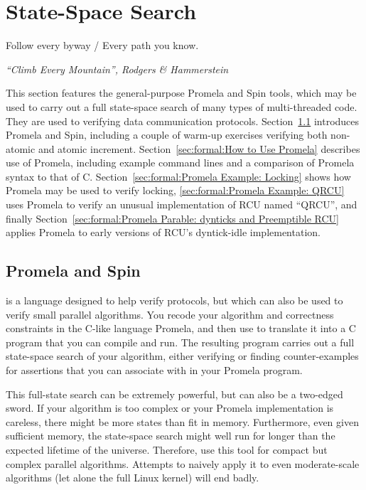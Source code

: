 
\section{State-Space Search}
\label{sec:formal:State-Space Search}
%
\epigraph{Follow every byway / Every path you know.}
	 {\emph{``Climb Every Mountain'', Rodgers \& Hammerstein}}

This section features the general-purpose Promela and Spin tools,
which may be used to carry out a full
state-space search of many types of multi-threaded code.
They are used to verifying data communication protocols.
Section~\ref{sec:formal:Promela and Spin}
introduces Promela and Spin, including a couple of warm-up exercises
verifying both non-atomic and atomic increment.
Section~\ref{sec:formal:How to Use Promela}
describes use of Promela, including example command lines and a
comparison of Promela syntax to that of C\@.
Section~\ref{sec:formal:Promela Example: Locking}
shows how Promela may be used to verify locking,
\ref{sec:formal:Promela Example: QRCU}
uses Promela to verify an unusual implementation of RCU named ``QRCU'',
and finally
Section~\ref{sec:formal:Promela Parable: dynticks and Preemptible RCU}
applies Promela to early versions of RCU's dyntick-idle implementation.

\subsection{Promela and Spin}
\label{sec:formal:Promela and Spin}

 is a language designed to help verify protocols, but which
can also be used to verify small parallel algorithms.
You recode your algorithm and correctness constraints in the C-like
language Promela, and then use  to translate it into a C program
that you can compile and run.
The resulting program carries out a full state-space search of your
algorithm, either verifying or finding counter-examples for
assertions that you can associate with in your Promela program.

This full-state search can be extremely powerful, but can also be a two-edged
sword.
If your algorithm is too complex or your Promela implementation is
careless, there might be more states than fit in memory.
Furthermore, even given sufficient memory, the state-space search might
well run for longer than the expected lifetime of the universe.
Therefore, use this tool for compact but complex parallel algorithms.
Attempts to naively apply it to even moderate-scale algorithms (let alone
the full Linux kernel) will end badly.


